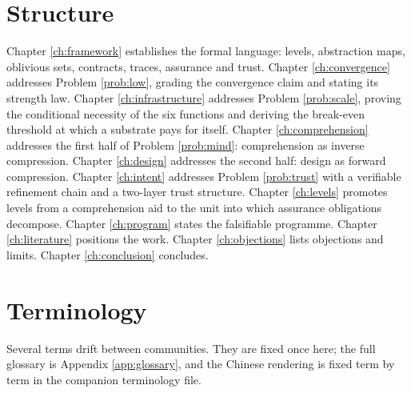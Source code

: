 \section{Structure}

Chapter \ref{ch:framework} establishes the formal language: levels, abstraction maps,
oblivious sets, contracts, traces, assurance and trust. Chapter \ref{ch:convergence}
addresses Problem \ref{prob:low}, grading the convergence claim and stating its strength
law. Chapter \ref{ch:infrastructure} addresses Problem \ref{prob:scale}, proving the
conditional necessity of the six functions and deriving the break-even threshold at which a substrate pays for itself.
Chapter \ref{ch:comprehension} addresses the first half of Problem \ref{prob:mind}:
comprehension as inverse compression. Chapter \ref{ch:design} addresses the second half:
design as forward compression. Chapter \ref{ch:intent} addresses Problem \ref{prob:trust}
with a verifiable refinement chain and a two-layer trust structure. Chapter
\ref{ch:levels} promotes levels from a comprehension aid to the unit into which assurance
obligations decompose. Chapter \ref{ch:program} states the falsifiable programme. Chapter
\ref{ch:literature} positions the work. Chapter \ref{ch:objections} lists objections and
limits. Chapter \ref{ch:conclusion} concludes.

\section{Terminology}

Several terms drift between communities. They are fixed once here; the full glossary is
Appendix \ref{app:glossary}, and the Chinese rendering is fixed term by term in the
companion terminology file.

